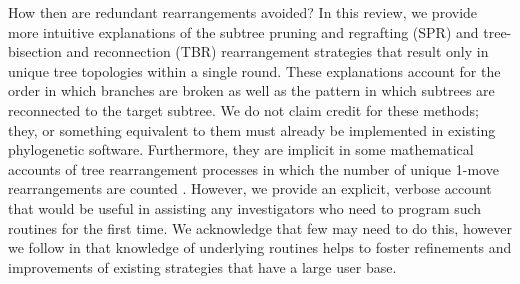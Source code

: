 \documentclass[12pt,letterpaper]{article}
\begin{document}
How then are redundant rearrangements avoided?
In this review, we provide more intuitive explanations of the subtree pruning and regrafting (SPR) and tree-bisection and reconnection (TBR) rearrangement strategies that result only in unique tree topologies within a single round.
These explanations account for the order in which branches are broken as well as the pattern in which subtrees are reconnected to the target subtree.
We do not claim credit for these methods; they, or something equivalent to them must already be implemented in existing phylogenetic software.
Furthermore, they are implicit in some mathematical accounts of tree rearrangement processes in which the number of unique 1-move rearrangements are counted \citep{allen2001subtree}.
However, we provide an explicit, verbose account that would be useful in assisting any investigators who need to program such routines for the first time. 
We acknowledge that few may need to do this, however we follow \citet{goloboff1993character} in that knowledge of underlying routines helps to foster refinements and improvements of existing strategies that have a large user base.


\end{document}
